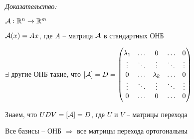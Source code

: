 \documentclass[12pt]{article}
\begin{document}
\textit{Доказательство:}

$\mathcal{A} : \mathbb R^n \to \mathbb R^m$

$\mathcal{A}(x) = Ax$, где $A$ -- матрица $\mathcal{A}$ в стандартных ОНБ

$\exists$ другие ОНБ такие, что $[\mathcal{A}] = D = \begin{pmatrix}
    \lambda_1 & \ldots & 0 & \ldots & 0 \\
    \vdots & \ddots & \vdots & \ddots & \vdots \\
    0 & \ldots & \lambda_k & \ldots & 0 \\
    \vdots & \ddots & \vdots & \ddots & \vdots \\
    0 & \ldots & 0 & \ldots & 0
\end{pmatrix}$

Знаем, что $UDV = [\mathcal{A}] = D$, где $U$ и $V$ -- матрицы перехода 

Все базисы -- ОНБ $\Rightarrow$ все матрицы перехода ортогональны
\end{document}

